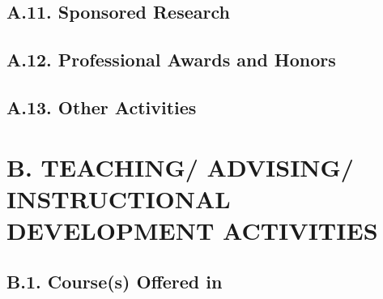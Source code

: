 \documentclass[12pt]{article}
\begin{document}

\subsection*{A.11. Sponsored Research}


\subsection*{A.12. Professional Awards and Honors}


\subsection*{A.13. Other Activities}



\section*{B. TEACHING/ ADVISING/ INSTRUCTIONAL DEVELOPMENT ACTIVITIES}


\subsection*{B.1. Course(s) Offered in \the\year}
\end{document}

